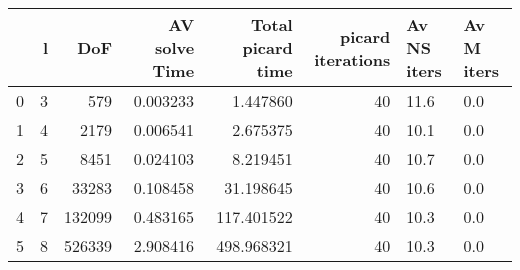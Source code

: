 \begin{tabular}{lrrrrrll}
\toprule
{} &  l &     DoF &  AV solve Time &  Total picard time &  picard iterations & Av NS iters & Av M iters \\
\midrule
0 &  3 &     579 &       0.003233 &           1.447860 &                 40 &        11.6 &        0.0 \\
1 &  4 &    2179 &       0.006541 &           2.675375 &                 40 &        10.1 &        0.0 \\
2 &  5 &    8451 &       0.024103 &           8.219451 &                 40 &        10.7 &        0.0 \\
3 &  6 &   33283 &       0.108458 &          31.198645 &                 40 &        10.6 &        0.0 \\
4 &  7 &  132099 &       0.483165 &         117.401522 &                 40 &        10.3 &        0.0 \\
5 &  8 &  526339 &       2.908416 &         498.968321 &                 40 &        10.3 &        0.0 \\
\bottomrule
\end{tabular}
